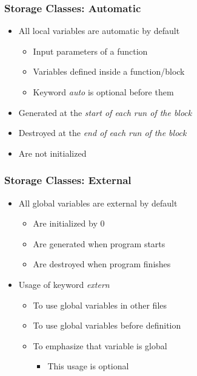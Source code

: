 \documentclass{../c-lecture}
\begin{document}
\begin{frame}
  \frametitle{Storage Classes: Automatic}
  \begin{itemize}
    \item All local variables are automatic by default
    \begin{itemize}
      \item Input parameters of a function
      \item Variables defined inside a function/block
      \item
        Keyword \textit{\color{YellowOrange} auto} is optional before them
    \end{itemize}
    \item
      Generated at the
      \textit{\color{LimeGreen} start of each run of the block}
    \item
      Destroyed at the
      \textit{\color{LimeGreen} end of each run of the block}
    \item Are not initialized
  \end{itemize}
\end{frame}

\begin{frame}
  \frametitle{Storage Classes: External}
  \begin{itemize}
    \item All global variables are external by default
    \begin{itemize}
      \item Are initialized by 0
      \item Are generated when program starts
      \item Are destroyed when program finishes
    \end{itemize}
  \item Usage of keyword \textit{\color{YellowOrange} extern}
    \begin{itemize}
      \item To use global variables in other files
      \item To use global variables before definition
      \item To emphasize that variable is global
      \begin{itemize}
        \item This usage is optional
      \end{itemize}
    \end{itemize}
  \end{itemize}
\end{frame}
\end{document}
